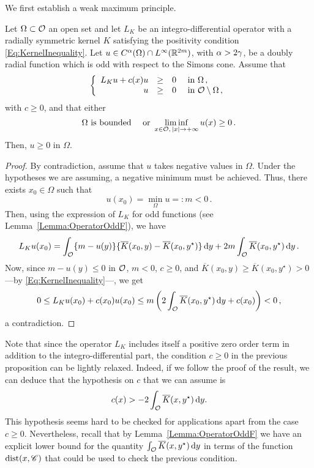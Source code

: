 We first establish a weak maximum principle.

\begin{proposition}
\label{Prop:WeakMaximumPrincipleForOddFunctions} Let $\Omega \subset \mathcal{O}$ an open set and let $L_K$ be an integro-differential operator with a radially symmetric kernel $K$ satisfying the positivity condition \eqref{Eq:KernelInequality}.  Let $u\in C^{\alpha}(\Omega)\cap L^\infty(\mathbb{R}^{2m})$, with $\alpha > 2\gamma$, be a doubly radial function which is odd with respect to the Simons cone. Assume that
$$
\left\{\begin{array}{rcll}
L_K u + c(x) u & \geq & 0 & \text{ in } \Omega\,,\\
u & \geq & 0 & \text{ in } \mathcal{O} \setminus \Omega\,,
\end{array} \right.
$$
with $c \geq 0$, and that either
$$
\Omega \text{ is bounded} \quad \text{ or } \liminf_{x \in \mathcal{O},\,|x|\to +\infty} u(x) \geq 0\,.
$$
Then, $u \geq 0$ in $\Omega$.
\end{proposition}

\begin{proof}
By contradiction, assume that $u$ takes negative values in $\Omega$. Under the hypotheses we are assuming, a negative minimum must be achieved. Thus, there exists $x_0\in \Omega$ such that
$$
u(x_0) = \min_{\Omega} u =: m < 0\,.
$$
Then, using the expression of $L_K$ for odd functions (see Lemma~\ref{Lemma:OperatorOddF}), we have
$$
L_K u (x_0) = \int_{\mathcal{O}} \{m - u(y) \} \{\overline{K}(x_0, y) - \overline{K}(x_0, y^\star)  \} \,\mathrm{d} y +  2 m \int_{\mathcal{O}} \overline{K}(x_0, y^\star) \,\mathrm{d} y\,.
$$
Now, since $m - u(y) \leq 0$ in $\mathcal{O}$, $m<0$, $c\geq 0$, and $\overline{K}(x_0, y) \geq \overline{K}(x_0, y^\star)>0$ ---by \eqref{Eq:KernelInequality}---, we get
$$
0 \leq L_K  u(x_0) + c(x_0) u(x_0) \leq m \left(2\int_{\mathcal{O}} \overline{K}(x_0, y^\star) \,\mathrm{d} y + c(x_0)\right)  < 0\,,
$$
a contradiction.
\end{proof}

\begin{remark}
Note that since the operator $L_K$ includes itself a positive zero order term in addition to the integro-differential part, the condition $c\geq 0$ in the previous proposition can be lightly relaxed. Indeed, if we follow the proof of the result, we can deduce that the hypothesis on $c$ that we can assume is 
$$ c(x) > -2\int_{\mathcal{O}} \overline{K}(x, y^\star) \,\mathrm{d} y. $$
This hypothesis seems hard to be checked for applications apart from the case $c\geq 0$. Nevertheless, recall that by Lemma~\ref{Lemma:OperatorOddF} we have an explicit lower bound for the quantity $ \int_{\mathcal{O}} \overline{K}(x, y^\star) \,\mathrm{d} y $ in terms of the function $\operatorname{dist}(x,\mathscr{C})$ that could be used to check the previous condition.
\end{remark}

